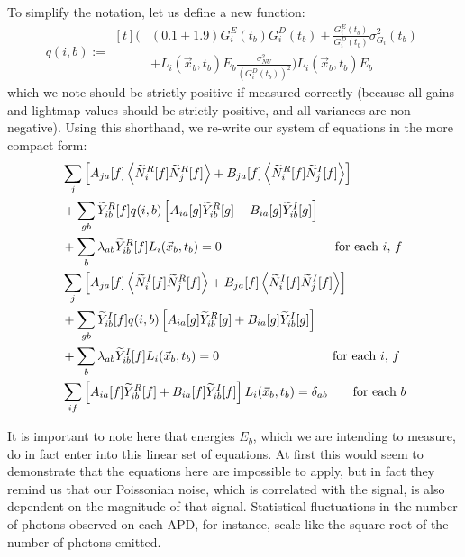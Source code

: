 To simplify the notation, let us define a new function:
\begin{equation} \label{eqn:DefinitionOfQ}
q(i,b) := \begin{aligned}[t]
  \bigg( &(0.1 + 1.9) G^E_i(t_b) G^D_i(t_b) + \frac{G^E_i(t_b)}{G^D_i(t_b)} \sigma^2_{G_i}(t_b)\\
  &+ L_i(\vec{x}_b,t_b) E_b \frac{\sigma^2_{NU}}{\left(G^D_i(t_b)\right)^2}\bigg)L_i(\vec{x}_b, t_b) E_b
\end{aligned}
\end{equation}
which we note should be strictly positive if measured correctly (because all gains and lightmap values should be strictly positive, and all variances are non-negative).  Using this shorthand, we re-write our system of equations in the more compact form:
\begin{subequations} \label{eqn:SystemToSolve} \begin{align}
&\sum_j \left[ A_{ja}[f] \left<\widetilde{N}_i^R[f]\widetilde{N}_j^R[f]\right> + B_{ja}[f] \left<\widetilde{N}_i^R[f]\widetilde{N}_j^I[f]\right>\right] \notag \\
&+ \sum_{gb} \widetilde{Y}_{ib}^R[f] q(i,b) \left[A_{ia}[g] \widetilde{Y}_{ib}^R[g] + B_{ia}[g] \widetilde{Y}_{ib}^I[g]\right] \notag \\
&+ \sum_b \lambda_{ab} \widetilde{Y}^R_{ib}[f] L_i(\vec{x}_b,t_b) = 0 \qquad \qquad \qquad \qquad \quad \text{for each $i$, $f$}\\
%
&\sum_j \left[ A_{ja}[f] \left<\widetilde{N}_i^I[f]\widetilde{N}_j^R[f]\right> + B_{ja}[f] \left<\widetilde{N}_i^I[f]\widetilde{N}_j^I[f]\right>\right] \notag \\
&+ \sum_{gb} \widetilde{Y}_{ib}^I[f] q(i,b) \left[A_{ia}[g] \widetilde{Y}_{ib}^R[g] + B_{ia}[g] \widetilde{Y}_{ib}^I[g]\right] \notag \\
&+ \sum_b \lambda_{ab} \widetilde{Y}^I_{ib}[f] L_i(\vec{x}_b,t_b) = 0 \qquad \qquad \qquad \qquad \quad \text{for each $i$, $f$}\\
%
&\sum_{if}\left[A_{ia}[f] \widetilde{Y}_{ib}^R[f] + B_{ia}[f] \widetilde{Y}_{ib}^I[f]\right] L_i(\vec{x}_b,t_b) = \delta_{ab} \qquad \text{for each $b$}
\end{align} \end{subequations}

It is important to note here that energies $E_b$, which we are intending to measure, do in fact enter into this linear set of equations.  At first this would seem to demonstrate that the equations here are impossible to apply, but in fact they remind us that our Poissonian noise, which is correlated with the signal, is also dependent on the magnitude of that signal.  Statistical fluctuations in the number of photons observed on each APD, for instance, scale like the square root of the number of photons emitted.

